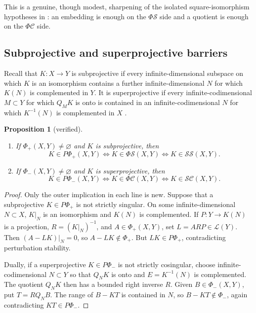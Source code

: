 \documentclass[11pt]{article}
\newtheorem{proposition}[theorem]{Proposition}
\theoremstyle{definition}
\newcommand{\Lop}{\mathcal L}
\newcommand{\SSing}{\mathcal{SS}}
\newcommand{\SCos}{\mathcal{SC}}
\newcommand{\PhiS}{\Phi\mathcal S}
\newcommand{\PhiC}{\Phi\mathcal C}
\newcommand{\PhiP}{\Phi_+}
\newcommand{\PhiM}{\Phi_-}
\newcommand{\PPhiP}{P\Phi_+}
\newcommand{\PPhiM}{P\Phi_-}
\begin{document}
This is a genuine, though modest, sharpening of the isolated square-isomorphism
hypotheses in \cite{GSB2023}: an embedding is enough on the \(\PhiS\) side and a quotient
is enough on the \(\PhiC\) side.

\subsection{Subprojective and superprojective barriers}

Recall that \(K\colon X\to Y\) is subprojective if every infinite-dimensional subspace on
which \(K\) is an isomorphism contains a further infinite-dimensional \(N\) for which
\(K(N)\) is complemented in \(Y\).  It is superprojective if every infinite-codimensional
\(M\subset Y\) for which \(Q_MK\) is onto is contained in an infinite-codimensional
\(N\) for which \(K^{-1}(N)\) is complemented in \(X\) \cite{GP2024}.

\begin{proposition}[verified]
\begin{enumerate}[label=\rm(\roman*)]
\item If \(\PhiP(X,Y)\ne\varnothing\) and \(K\) is subprojective, then
\[
 K\in\PPhiP(X,Y)\iff K\in\PhiS(X,Y)\iff K\in\SSing(X,Y).
\]
\item If \(\PhiM(X,Y)\ne\varnothing\) and \(K\) is superprojective, then
\[
 K\in\PPhiM(X,Y)\iff K\in\PhiC(X,Y)\iff K\in\SCos(X,Y).
\]
\end{enumerate}
\end{proposition}

\begin{proof}
Only the outer implication in each line is new.  Suppose that a subprojective
\(K\in\PPhiP\) is not strictly singular.  On some infinite-dimensional \(N\subset X\),
\(K|_N\) is an isomorphism and \(K(N)\) is complemented.  If \(P\colon Y\to K(N)\)
is a projection, \(R=(K|_N)^{-1}\), and \(A\in\PhiP(X,Y)\), set
\(L=ARP\in\Lop(Y)\).  Then \((A-LK)|_N=0\), so \(A-LK\notin\PhiP\).  But
\(LK\in\PPhiP\), contradicting perturbation stability.

Dually, if a superprojective \(K\in\PPhiM\) is not strictly cosingular, choose
infinite-codimensional \(N\subset Y\) so that \(Q_NK\) is onto and
\(E=K^{-1}(N)\) is complemented.  The quotient \(Q_NK\) then has a bounded right
inverse \(R\).  Given \(B\in\PhiM(X,Y)\), put \(T=RQ_NB\).  The range of
\(B-KT\) is contained in \(N\), so \(B-KT\notin\PhiM\), again contradicting
\(KT\in\PPhiM\).
\end{proof}
\end{document}

